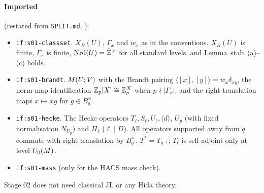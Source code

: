 \paragraph{Imported} (restated from \texttt{SPLIT.md}, ):
\begin{itemize}
\item \texttt{if:s01-classset}. $X_B(U)$, $\Gamma_x$ and $w_x$ as in the conventions. $X_B(U)$ is finite,
  $\Gamma_x$ is finite, $\mathrm{Nrd}(U)=\hat{\mathbb{Z}}^\times$ for all standard levels, and Lemma~stab~(a)--(c) holds.
\item \texttt{if:s01-brandt}. $M(U;V)$ with the Brandt pairing $\langle[x],[y]\rangle=w_x\delta_{xy}$, the
  norm-map identification $\mathbb{Z}_p[X]\cong\mathbb{Z}_p^X$ when $p\nmid|\Gamma_x|$, and the right-translation maps $x\mapsto xg$
  for $g\in B_q^\times$. 
\item \texttt{if:s01-hecke}. The Hecke operators $T_\ell,S_\ell,U_\ell,\langle d\rangle$, $U_p$ (with fixed
  normalisation $N_{U_p}$) and $\Pi_\ell$ ($\ell\mid D$). All operators supported away from $q$ commute with
  right translation by $B_q^\times$. $T^*=T_{g^{-1}}$; $T_\ell$ is self-adjoint only at level $U_0(M)$.
\item \texttt{if:s01-mass} (only for the HACS mass check). 
\end{itemize}
Stage 02 does not need classical JL or any Hida theory.

